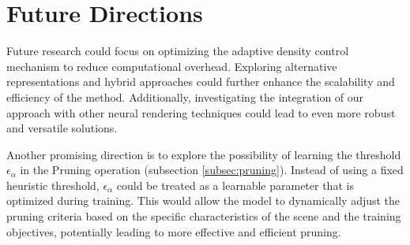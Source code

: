 \documentclass[11pt]{report}
\begin{document}
\section{Future Directions}
Future research could focus on optimizing the adaptive density control mechanism to reduce computational overhead. Exploring alternative representations and hybrid approaches could further enhance the scalability and efficiency of the method. Additionally, investigating the integration of our approach with other neural rendering techniques could lead to even more robust and versatile solutions.

Another promising direction is to explore the possibility of learning the threshold $\epsilon_\alpha$ in the Pruning operation (subsection \ref{subsec:pruning}). Instead of using a fixed heuristic threshold, $\epsilon_\alpha$ could be treated as a learnable parameter that is optimized during training. This would allow the model to dynamically adjust the pruning criteria based on the specific characteristics of the scene and the training objectives, potentially leading to more effective and efficient pruning.
\end{document}
